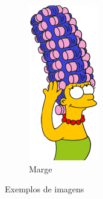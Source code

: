 \documentclass[paper=a4, fontsize=11pt]{scrartcl} %
\numberwithin{equation}{section} %
\numberwithin{figure}{section} %
\numberwithin{table}{section} %
\begin{document}
\begin{figure}
\begin{subfigure}[b]{0.15\textwidth}
        \includegraphics[width=\textwidth]{marge001}
        \caption{Marge}
        \label{fig:marge}
    \end{subfigure}
    \caption{Exemplos de imagens}\label{fig:exemplos}
\end{figure}
\end{document}
